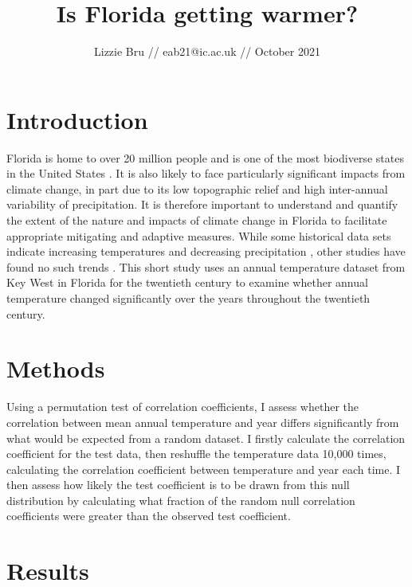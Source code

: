\documentclass{article}
\title{\textbf{Is Florida getting warmer?\vspace{-0.5em}}}
\author{Lizzie Bru // eab21@ic.ac.uk // October 2021}
\date{}
\begin{document}
\maketitle

\section{Introduction \vspace{-0.5em}}

    Florida is home to over 20 million people and is one of the most biodiverse states in the United States \cite{usda}. It is also likely to face particularly significant impacts from climate change, in part due to its low topographic relief and high inter-annual variability of precipitation. It is therefore important to understand and quantify the extent of the nature and impacts of climate change in Florida to facilitate appropriate mitigating and adaptive measures. While some historical data sets indicate increasing temperatures and decreasing precipitation \cite{irizarry2013historical}, other studies have found no such trends \cite{obeysekera2011climate}. This short study uses an annual temperature dataset from Key West in Florida for the twentieth century to examine whether annual temperature changed significantly over the years throughout the twentieth century. \vspace{-1em}

\section{Methods \vspace{-0.5em}}

Using a permutation test of correlation coefficients, I assess whether the correlation between mean annual temperature and year differs significantly from what would be expected from a random dataset. I firstly calculate the correlation coefficient for the test data, then reshuffle the temperature data 10,000 times, calculating the correlation coefficient between temperature and year each time. I then assess how likely the test coefficient is to be drawn from this null distribution by calculating what fraction of the random null correlation coefficients were greater than the observed test coefficient. \vspace{-1em}

\section{Results \vspace{-0.5em}}
\end{document}
